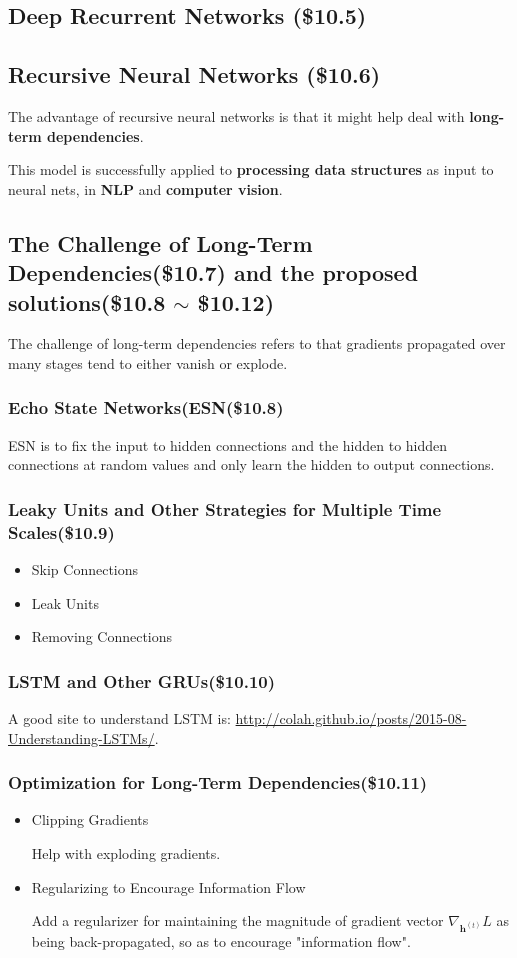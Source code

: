 \documentclass[12pt]{article}
\numberwithin{equation}{section}
\begin{document}
\subsection{Deep Recurrent Networks (\$10.5)}
\subsection{Recursive Neural Networks (\$10.6)}
	The advantage of recursive neural networks is that it might help deal with \textbf{long-term dependencies}. \par
	This model is successfully applied to \textbf{processing data structures} as input to neural nets, in \textbf{NLP} and \textbf{computer vision}.
\subsection{The Challenge of Long-Term Dependencies(\$10.7) and the proposed solutions(\$10.8 $\sim$ \$10.12)}
	The challenge of long-term dependencies refers to that gradients propagated over many stages tend to either vanish or explode. \par
	\subsubsection{Echo State Networks(ESN(\$10.8)}
	ESN is to fix the input to hidden connections and the hidden to hidden connections at random values and only learn the hidden to output connections.
	\subsubsection{Leaky Units and Other Strategies for Multiple Time Scales(\$10.9)}
	\begin{itemize}
		\item Skip Connections
		\item Leak Units
		\item Removing Connections
	\end{itemize}
	\subsubsection{LSTM and Other GRUs(\$10.10)}
	A good site to understand LSTM is: \url{http://colah.github.io/posts/2015-08-Understanding-LSTMs/}. \par
	\subsubsection{Optimization for Long-Term Dependencies(\$10.11)}
	\begin{itemize}
		\item Clipping Gradients \par
			Help with exploding gradients.
		\item Regularizing to Encourage Information Flow \par
			Add a regularizer for maintaining the magnitude of gradient vector $\nabla_{\bm{h}^(t)}L$ as being back-propagated, so as to encourage "information flow".
	\end{itemize}	
\end{document}

